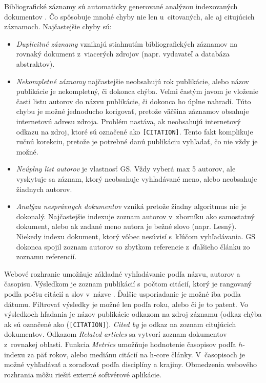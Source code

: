 Bibliografické záznamy sú automaticky generované analýzou indexovaných
dokumentov \citep{Vine2006}. Čo spôsobuje mnohé chyby nie len u~citovaných, ale
aj citujúcich záznamoch. Najčastejšie chyby sú:
\begin{itemize}
  \item \emph{Duplicitné záznamy} vznikajú stiahnutím bibliografických záznamov
    na rovnaký dokument z~viacerých zdrojov (napr. vydavateľ a databáza abstraktov).
  \item \emph{Nekompletné záznamy} najčastejšie neobsahujú rok publikácie,
    alebo názov publikácie je nekompletný, či dokonca chýba.  Veľmi častým
    javom je vloženie časti listu autorov do názvu publikácie, či dokonca ho
    úplne nahradí.  Túto chybu je možné jednoducho korigovať, pretože väčšina
    záznamov obsahuje internetovú adresu zdroja. Problém nastáva, ak neobsahujú
    internetový odkazu na zdroj, ktoré sú označené ako \texttt{[CITATION]}.
    Tento fakt komplikuje ručnú korekciu, pretože je potrebné danú publikáciu
    vyhľadať, čo nie vždy je možné.
  \item \emph{Neúplny list autorov} je vlastnosť GS. Vždy vyberá max 5 autorov,
    ale vyskytuje sa záznam, ktorý neobsahuje vyhľadávané meno, alebo neobsahuje
    žiadnych autorov.
  \item \emph{Analýza nesprávnych dokumentov} vzniká pretože žiadny algoritmus nie je
    dokonalý.  Najčastejšie indexuje zoznam autorov v~zborníku ako samostatný
    dokument, alebo ak zadané meno autora je bežné slovo (napr. Lesný).  Niekedy
    indexu dokument, ktorý vôbec nesúvisí s~kľúčom vyhľadávania.
    GS dokonca spojil zoznam autorov so zbytkom referencie z~ďalšieho článku zo
    zoznamu referencií.
\end{itemize}

\noindent Webové rozhranie umožňuje základné vyhľadávanie podľa názvu, autorov a
časopisu.  Výsledkom je zoznam publikácií s~počtom citácií, ktorý je rangovaný
podľa počtu citácií a slov v~názve \citep{Beel2009}.  Ďalšie usporiadanie je
možné iba podľa dátumu.  Filtrovať výsledky je možné len podľa roku, alebo či
je to patent.  Vo výsledkoch hľadania je názov publikácie odkazom na zdroj
záznamu (odkaz chýba ak sú označené ako (\texttt{[CITATION]}). \emph{Cited by}
je odkaz na zoznam citujúcich dokumentov.  Odkazom \emph{Related articles} sa
vytvorí zoznam dokumentov z~rovnakej oblasti.  Funkcia \emph{Metrics} umožňuje
hodnotenie časopisov podľa $h$-indexu za päť rokov, alebo mediánu citácií na
h-core články. V~časopisoch je možné vyhľadávať a zoraďovať podľa disciplíny a
krajiny.  Obmedzenia webového rozhrania môžu riešiť externé softvérové aplikácie.

